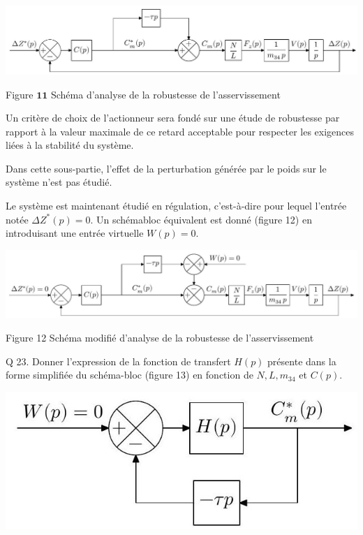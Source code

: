 \documentclass[10pt]{article}
\begin{document}
\begin{center}
\includegraphics[max width=\textwidth]{2022_12_31_ed674c1a831ea1bff3a0g-09}
\end{center}

Figure $\mathbf{1 1}$ Schéma d'analyse de la robustesse de l'asservissement

Un critère de choix de l'actionneur sera fondé sur une étude de robustesse par rapport à la valeur maximale de ce retard acceptable pour respecter les exigences liées à la stabilité du système.

Dans cette sous-partie, l'effet de la perturbation générée par le poids sur le système n'est pas étudié.

Le système est maintenant étudié en régulation, c'est-à-dire pour lequel l'entrée notée $\Delta Z^{*}(p)=0$. Un schémabloc équivalent est donné (figure 12) en introduisant une entrée virtuelle $W(p)=0$.

\begin{center}
\includegraphics[max width=\textwidth]{2022_12_31_ed674c1a831ea1bff3a0g-09(1)}
\end{center}

Figure 12 Schéma modifié d'analyse de la robustesse de l'asservissement

Q 23. Donner l'expression de la fonction de transfert $H(p)$ présente dans la forme simplifiée du schéma-bloc (figure 13) en fonction de $N, L, m_{34}$ et $C(p)$.

\begin{center}
\includegraphics[max width=\textwidth]{2022_12_31_ed674c1a831ea1bff3a0g-09(2)}
\end{center}
\end{document}
